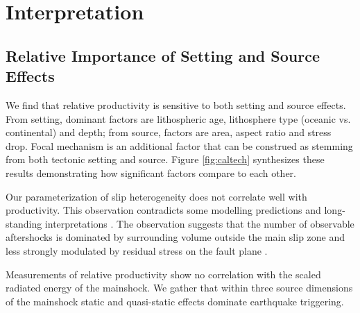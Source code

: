 \documentclass[draft]{agujournal2018}
\begin{document}
   

\section{Interpretation}

\subsection{Relative Importance of Setting and Source Effects}

We find that relative productivity is sensitive to both setting and source effects. From setting, dominant factors are lithospheric age, lithosphere type (oceanic vs. continental) and depth; from source, factors are area, aspect ratio and stress drop. Focal mechanism is an additional factor that can be construed as stemming from both tectonic setting and source. Figure \ref{fig:caltech} synthesizes these results demonstrating how significant factors compare to each other.
    
Our parameterization of slip heterogeneity does not correlate well with productivity. This observation contradicts some modelling predictions \citep{Helmstetter2006RelationModel, Marsan2006} and long-standing interpretations \citep{Mogi1967}. The observation suggests that the number of observable aftershocks is dominated by surrounding volume outside the main slip zone and less strongly modulated by residual stress on the fault plane \citep[as would be consistent with][]{Wetzler2018SystematicEarthquakes}. 
    
Measurements of relative productivity show no correlation with the scaled radiated energy of the mainshock. We gather that within three source dimensions of the mainshock static and quasi-static effects dominate earthquake triggering.
    
\end{document}
